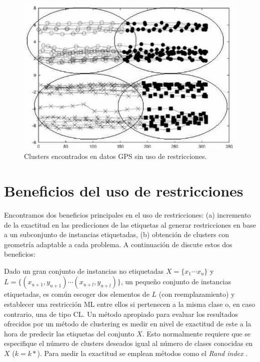 \begin{figure}[!h]
	\centering
	\includegraphics[scale=0.3]{imagenes/c3/GPS/Instancias} 
	\caption{Clusters encontrados en datos GPS sin uso de restricciones. \cite{Wagstaff:2001b} \cite{Survey:2007}}\label{fig:figure15}
\end{figure}

\section{Beneficios del uso de restricciones}

Encontramos dos beneficios principales en el uso de restricciones: (a) incremento de la exactitud en las predicciones de las etiquetas al generar restricciones en base a un subconjunto de instancias etiquetadas, (b) obtención de clusters con geometría adaptable a cada problema. A continuación de discute estos dos beneficios:

Dado un gran conjunto de instancias no etiquetadas $X = \{x_1 \cdots x_u\}$ y $L = \{(x_{u+1}, y_{u+1})\cdots (x_{u+l}, y_{u+l})\}$, un pequeño conjunto de instancias etiquetadas, es común escoger dos elementos de $L$ (con reemplazamiento) y establecer una restricción \acs{ML} entre ellos si pertenecen a la misma clase o, en caso contrario, una de tipo \acs{CL}. Un método apropiado para evaluar los resultados ofrecidos por un método de clustering es medir en nivel de exactitud de este a la hora de predecir las etiquetas del conjunto $X$. Esto normalmente requiere que se especifique el número de clusters deseados igual al número de clases conocidas en $X$ ($k = k*$). Para medir la exactitud se emplean métodos como el \textit{Rand index} \cite{Rand:1971}.

